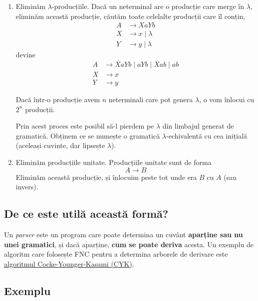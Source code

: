 \begin{enumerate}
    \item Eliminăm \(\lambda\)-producțiile. Dacă un neterminal are o producție care merge în \(\lambda\), eliminăm această producție, căutăm toate celelalte producții care îl conțin,
          \begin{align*}
              A & \to XaYb           \\
              X & \to x \mid \lambda \\
              Y & \to y \mid \lambda
          \end{align*}
          devine
          \begin{align*}
              A & \to XaYb \mid aYb \mid Xab \mid ab \\
              X & \to x                              \\
              Y & \to y
          \end{align*}

          Dacă într-o producție avem \(n\) neterminali care pot genera \(\lambda\), o vom înlocui cu \(2^n\) producții.

          \begin{observation}
              Prin acest proces este posibil să-l pierdem pe \(\lambda\) din limbajul generat de gramatică. Obținem ce se numește o gramatică \(\lambda\)-echivalentă cu cea inițială (aceleași cuvinte, dar lipsește \(\lambda\)).
          \end{observation}

    \item Eliminăm producțiile unitate. Producțiile unitate sunt de forma
          \[A \to B\]
          Eliminăm această producție, și înlocuim peste tot unde era \(B\) cu \(A\) (sau invers).
\end{enumerate}

\subsection*{De ce este utilă această formă?}

Un \emph{parser} este un program care poate determina un cuvânt \textbf{aparține sau nu unei gramatici}, și dacă aparține, \textbf{cum se poate deriva} acesta.
Un exemplu de algoritm care folosește FNC pentru a determina arborele de derivare este \href{https://en.wikipedia.org/wiki/CYK_algorithm}{algoritmul Cocke-Younger-Kasami (CYK)}.

\subsection*{Exemplu}

